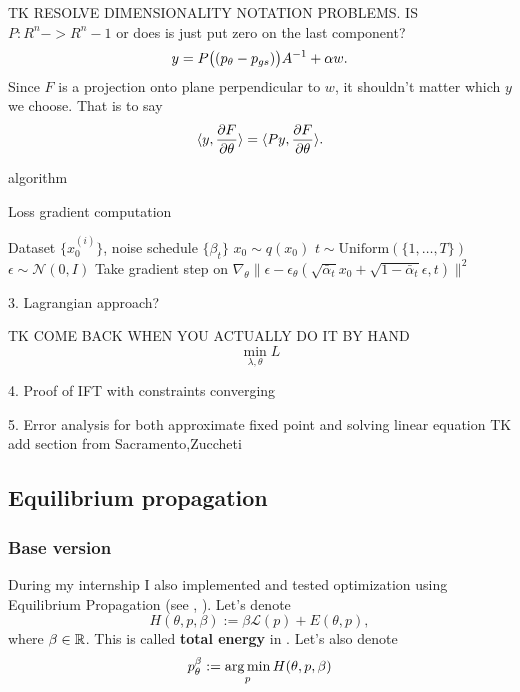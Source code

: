 \documentclass[a4paper,10pt]{report}
\begin{document}
TK RESOLVE DIMENSIONALITY NOTATION PROBLEMS. IS $P:R^n ->R^n-1$ or does is just put zero on the last component?
\begin{equation}
 y = P\big((p_\theta-p_{gs})\big)A^{-1} + \alpha w.
\end{equation}
Since $F$ is a projection onto plane perpendicular to $w$, it shouldn't matter which $y$ we choose.
That is to say
\begin{equation}
 \langle y,  \frac{\partial F}{\partial \theta} \rangle=\langle Py, \frac{\partial F}{\partial \theta} \rangle.
\end{equation}


algorithm


\begin{algorithm}
\caption{Loss gradient computation}
\begin{algorithmic}
\Require Dataset $\{x_0^{(i)}\}$, noise schedule $\{\beta_t\}$
\Repeat
    \State $x_0 \sim q(x_0)$
    \State $t \sim \text{Uniform}(\{1, \ldots, T\})$
    \State $\epsilon \sim \mathcal{N}(0, I)$
    \State Take gradient step on $\nabla_\theta \|\epsilon - \epsilon_\theta(\sqrt{\bar{\alpha}_t}x_0 + \sqrt{1-\bar{\alpha}_t}\epsilon, t)\|^2$
\end{algorithmic}
\end{algorithm}


3. Lagrangian approach?

TK COME BACK WHEN YOU ACTUALLY DO IT BY HAND
 \begin{equation}
\min_{\lambda,\theta} L
 \end{equation}

4. Proof of IFT with constraints converging

5. Error analysis for both approximate fixed point and solving linear equation
TK add section from Sacramento,Zuccheti
\subsection{ Equilibrium propagation}

\subsubsection{Base version}
During my internship I also implemented and tested optimization using Equilibrium Propagation (see \cite{eqprop}, \cite{zucchet2022beyond}).
Let's denote
\begin{equation}
H(\theta, p, \beta) := \beta \mathcal{L}(p) + E(\theta, p),
\end{equation}
where $\beta \in \mathbb{R}$.
 This is called \textbf{total energy} in \cite{eqprop}. Let's also denote
\begin{equation}
p_{\theta}^{\beta}:=\operatorname*{arg\,min}_p H(\theta, p, \beta)
\end{equation}
\end{document}
